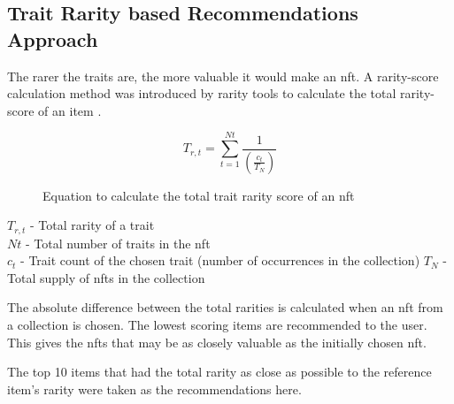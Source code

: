 \documentclass[conference]{IEEEtran}
\begin{document}
\subsection{Trait Rarity based Recommendations Approach}
The rarer the traits are, the more valuable it would make an \gls{nft}. A rarity-score calculation method was introduced by rarity tools to calculate the total rarity-score of an item \autocite{raritytools_introducing_2021}.

\begin{figure}[htbp]
\begin{equation}
T_{r,t} = \sum^{Nt}_{t=1} \frac{1}{\left(\frac{c_{t}}{T_{N}}\right)}
\end{equation}
\caption{Equation to calculate the total trait rarity score of an \gls{nft} \autocite{raritytools_ranking_2021}}
\end{figure}

\noindent$T_{r,t}$ - Total rarity of a trait\\
$Nt$ - Total number of traits in the \gls{nft}\\
$c_{t}$ - Trait count of the chosen trait (number of occurrences in the collection)
$T_{N}$ - Total supply of \gls{nft}s in the collection

The absolute difference between the total rarities is calculated when an \gls{nft} from a collection is chosen. The lowest scoring items are recommended to the user. This gives the \gls{nft}s that may be as closely valuable as the initially chosen \gls{nft}.

The top 10 items that had the total rarity as close as possible to the reference item's rarity were taken as the recommendations here.
\end{document}
